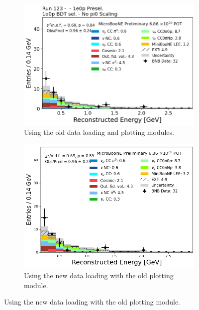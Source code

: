 \begin{figure}[H]
 \centering
    \begin{subfigure}[t]{0.32\linewidth}
        \includegraphics[width=\linewidth]{technote/EventSelections/Figures/Run123_1e0p_RecoEnergy_Old.png}
        \caption{Using the old data loading and plotting modules.}
    \end{subfigure}%
    \hspace{0.3cm}%
    \begin{subfigure}[t]{0.32\linewidth}
        \includegraphics[width=\linewidth]{technote/EventSelections/Figures/Run123_1e0p_RecoEnergy_Chris.png}%
        \caption{Using the new data loading with the old plotting module.}
    \end{subfigure}%
    \hspace{0.3cm}%

\end{figure}
